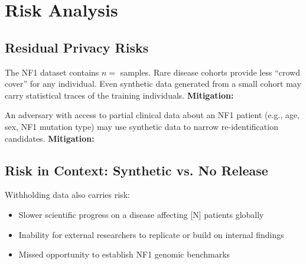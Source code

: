 \section{Risk Analysis}
\label{sec:risk}

\subsection{Residual Privacy Risks}

\begin{riskbox}[title={Small cohort amplification}]
  The NF1 dataset contains $n = $  samples.
  Rare disease cohorts provide less ``crowd cover'' for any individual.
  Even synthetic data generated from a small cohort may carry
  statistical traces of the training individuals.
  \textbf{Mitigation:} 
\end{riskbox}

\begin{riskbox}[title={Auxiliary information attacks}]
  An adversary with access to partial clinical data about an NF1 patient
  (e.g., age, sex, NF1 mutation type) may use synthetic data
  to narrow re-identification candidates.
  \textbf{Mitigation:} 
\end{riskbox}



\subsection{Risk in Context: Synthetic vs. No Release}

Withholding data also carries risk:
\begin{itemize}
  \item Slower scientific progress on a disease affecting [N] patients
        globally
  \item Inability for external researchers to replicate or build on
        internal findings
  \item Missed opportunity to establish NF1 genomic benchmarks
\end{itemize}

